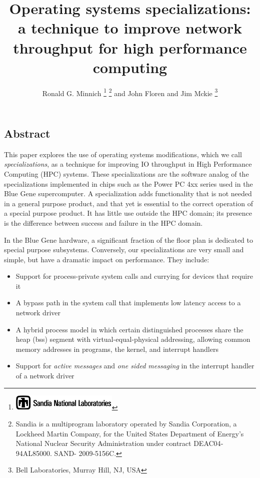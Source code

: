 \documentclass[letterpaper,twocolumn,10pt]{article}
\date{}
\begin{document}
\author{Ronald G. Minnich%
\thanks{\protect\includegraphics[height=0.3in]{thunderchicken}%
}%
\thanks{Sandia is a multiprogram laboratory operated by Sandia Corporation, a Lockheed Martin Company, for the United States Department of Energy’s National Nuclear Security Administration under contract DE­AC04­94AL85000. SAND- 2009-5156C.}  and John Floren and Jim Mckie
\thanks{Bell Laboratories, Murray Hill, NJ, USA }
}
\title{\Large \bf Operating systems specializations: a technique to improve network  throughput for high performance computing}
\maketitle
\thispagestyle{empty}
\pagestyle{empty}
\subsection*{Abstract}
This paper explores the use of operating systems modifications, which we call {\em specializations}, as a technique for improving IO throughput in High Performance Computing (HPC) systems. 
These specializations are the software analog of the specializations implemented in chips such as the Power PC 4xx series used in the Blue Gene supercomputer. A 
specialization adds functionality that is not needed in a general purpose product, and that yet is essential to the correct operation of a special purpose product. It has  little use 
outside the HPC domain; its presence is the difference between success and failure in the HPC domain. 

In the Blue Gene hardware, a significant fraction of the floor plan is dedicated to special purpose subsystems. Conversely, our specializations are very small and simple, but have a dramatic impact on performance. 
They include: 
\begin{itemize}
\item Support for process-private system calls and currying for devices that require it
\item A bypass path in the system call that implements low latency access to a network driver
\item A hybrid process model in which certain distinguished processes share the heap (bss) segment with virtual-equal-physical addressing, allowing common memory addresses in programs, the kernel, and interrupt handlers
\item Support for {\em active messages} and {\em one sided messaging} in the interrupt handler of a network driver
\end{itemize}
\end{document}
